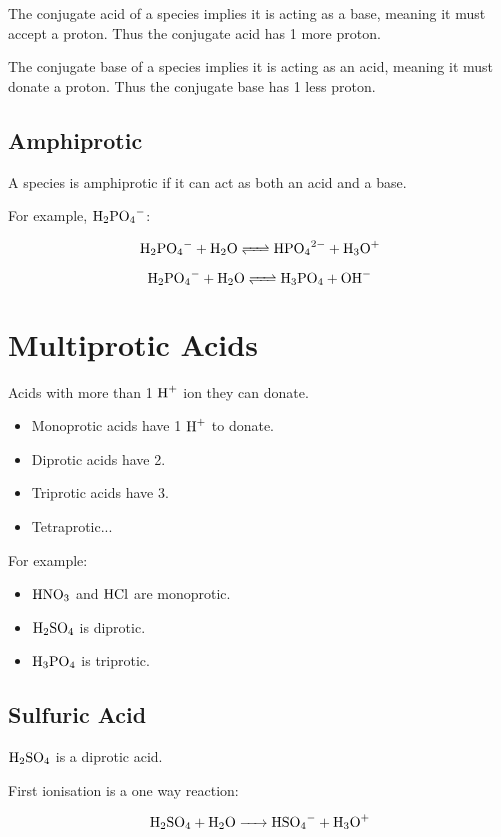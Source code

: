 \documentclass[a4paper,11pt]{article}
\begin{document}
The conjugate acid of a species implies it is acting as a base, meaning it must
accept a proton. Thus the conjugate acid has 1 more proton.

The conjugate base of a species implies it is acting as an acid, meaning it must
donate a proton. Thus the conjugate base has 1 less proton.


\subsection{Amphiprotic}

A species is amphiprotic if it can act as both an acid and a base.

For example, $\ce{H2PO4-}$:

$$
\ce{H2PO4- + H2O <=> HPO4^2- + H3O+}
$$

$$
\ce{H2PO4- + H2O <=> H3PO4 + OH-}
$$


\section{Multiprotic Acids}

Acids with more than 1 $\ce{H+}$ ion they can donate.

\begin{itemize}
\item Monoprotic acids have 1 $\ce{H+}$ to donate.
\item Diprotic acids have 2.
\item Triprotic acids have 3.
\item Tetraprotic...
\end{itemize}

For example:

\begin{itemize}
\item $\ce{HNO3}$ and $\ce{HCl}$ are monoprotic.
\item $\ce{H2SO4}$ is diprotic.
\item $\ce{H3PO4}$ is triprotic.
\end{itemize}


\subsection{Sulfuric Acid}

$\ce{H2SO4}$ is a diprotic acid.

First ionisation is a one way reaction:

$$
\ce{H2SO4 + H2O -> HSO4- + H3O+}
$$
\end{document}
